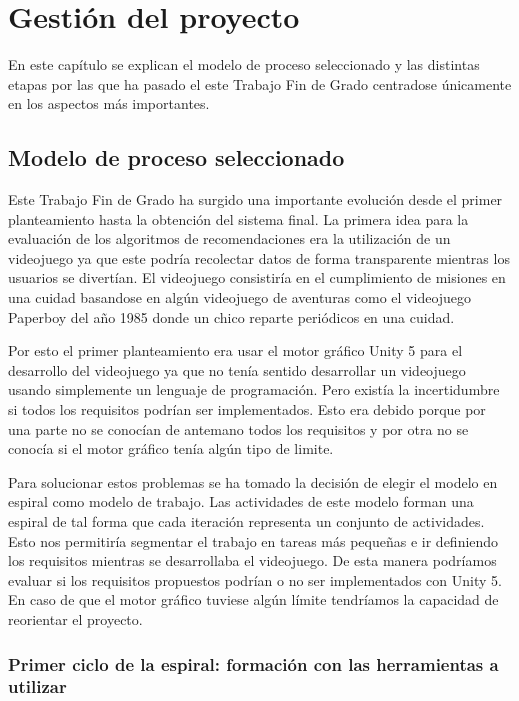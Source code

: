\chapter{Gestión del proyecto}

En este capítulo se explican el modelo de proceso seleccionado y las distintas etapas por las que ha pasado el este Trabajo Fin de Grado centradose únicamente en los aspectos más importantes.

\section{Modelo de proceso seleccionado}


Este Trabajo Fin de Grado ha surgido una importante evolución desde el primer planteamiento hasta la obtención del sistema final. La primera idea para la evaluación de los algoritmos de recomendaciones era la utilización de un videojuego ya que este podría recolectar datos de forma transparente mientras los usuarios se divertían. El videojuego consistiría en el cumplimiento de misiones en una cuidad basandose en algún videojuego de aventuras como el videojuego Paperboy del año 1985 donde un chico reparte periódicos en una cuidad.

Por esto el primer planteamiento era usar el motor gráfico Unity 5 para el desarrollo del videojuego ya que no tenía sentido desarrollar un videojuego usando simplemente un lenguaje de programación. Pero existía la incertidumbre si todos los requisitos podrían ser implementados. Esto era debido porque por una parte no se conocían de antemano todos los requisitos y por otra no se conocía si el motor gráfico tenía algún tipo de limite. 

Para solucionar estos problemas se ha tomado la decisión de elegir el modelo en espiral como modelo de trabajo. Las actividades de este modelo forman una espiral de tal forma que cada iteración representa un conjunto de actividades. Esto nos permitiría segmentar el trabajo en tareas más pequeñas e ir definiendo los requisitos mientras se desarrollaba el videojuego. De esta manera podríamos evaluar si los requisitos propuestos podrían o no ser implementados con Unity 5. En caso de que el motor gráfico tuviese algún límite tendríamos la capacidad de reorientar el proyecto.

\subsection{Primer ciclo de la espiral: formación con las herramientas a utilizar}

